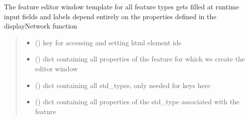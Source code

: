\documentclass[letterpaper,10pt,english]{sphinxmanual}
\begin{document}
\begin{fulllineitems}
\label{\detokenize{docs_gui/js_api/network_editor/display_editable_network_features:populateEditableNetworkEditor}}
\pysigstartsignatures
{}
\pysigstopsignatures
\sphinxAtStartPar
The feature editor window template for all feature types gets filled at runtime
input fields and labels depend entirely on the properties defined in the displayNetwork function
\begin{quote}\begin{description}
\begin{itemize}
\item {} 
\sphinxAtStartPar
{} () \textendash{} key for accessing and setting html element ids

\item {} 
\sphinxAtStartPar
{} () \textendash{} dict containing all properties of the feature for which we create the editor window

\item {} 
\sphinxAtStartPar
{} () \textendash{} dict containing all std\_types, only needed for keys here

\item {} 
\sphinxAtStartPar
{} () \textendash{} dict containing all properties of the std\_type associated with the feature

\end{itemize}

\end{description}\end{quote}

\end{fulllineitems}

\end{document}
